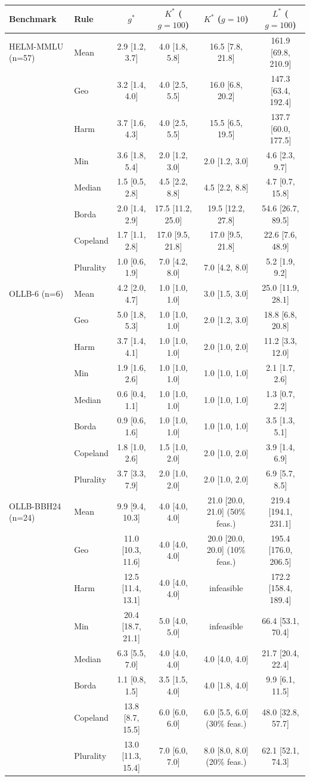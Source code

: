 \begin{tabular}{llcccc}\toprule
Benchmark & Rule & $g^*$ & $K^*$ ($g{=}100$) & $K^*$ ($g{=}10$) & $L^*$ ($g{=}100$)\\\midrule
HELM-MMLU (n=57) & Mean & 2.9 [1.2, 3.7] & 4.0 [1.8, 5.8] & 16.5 [7.8, 21.8] & 161.9 [69.8, 210.9]\\
 & Geo & 3.2 [1.4, 4.0] & 4.0 [2.5, 5.5] & 16.0 [6.8, 20.2] & 147.3 [63.4, 192.4]\\
 & Harm & 3.7 [1.6, 4.3] & 4.0 [2.5, 5.5] & 15.5 [6.5, 19.5] & 137.7 [60.0, 177.5]\\
 & Min & 3.6 [1.8, 5.4] & 2.0 [1.2, 3.0] & 2.0 [1.2, 3.0] & 4.6 [2.3, 9.7]\\
 & Median & 1.5 [0.5, 2.8] & 4.5 [2.2, 8.8] & 4.5 [2.2, 8.8] & 4.7 [0.7, 15.8]\\
 & Borda & 2.0 [1.4, 2.9] & 17.5 [11.2, 25.0] & 19.5 [12.2, 27.8] & 54.6 [26.7, 89.5]\\
 & Copeland & 1.7 [1.1, 2.8] & 17.0 [9.5, 21.8] & 17.0 [9.5, 21.8] & 22.6 [7.6, 48.9]\\
 & Plurality & 1.0 [0.6, 1.9] & 7.0 [4.2, 8.0] & 7.0 [4.2, 8.0] & 5.2 [1.9, 9.2]\\
\midrule
OLLB-6 (n=6) & Mean & 4.2 [2.0, 4.7] & 1.0 [1.0, 1.0] & 3.0 [1.5, 3.0] & 25.0 [11.9, 28.1]\\
 & Geo & 5.0 [1.8, 5.3] & 1.0 [1.0, 1.0] & 2.0 [1.2, 3.0] & 18.8 [6.8, 20.8]\\
 & Harm & 3.7 [1.4, 4.1] & 1.0 [1.0, 1.0] & 2.0 [1.0, 2.0] & 11.2 [3.3, 12.0]\\
 & Min & 1.9 [1.6, 2.6] & 1.0 [1.0, 1.0] & 1.0 [1.0, 1.0] & 2.1 [1.7, 2.6]\\
 & Median & 0.6 [0.4, 1.1] & 1.0 [1.0, 1.0] & 1.0 [1.0, 1.0] & 1.3 [0.7, 2.2]\\
 & Borda & 0.9 [0.6, 1.6] & 1.0 [1.0, 1.0] & 1.0 [1.0, 1.0] & 3.5 [1.3, 5.1]\\
 & Copeland & 1.8 [1.0, 2.6] & 1.5 [1.0, 2.0] & 2.0 [1.0, 2.0] & 3.9 [1.4, 6.9]\\
 & Plurality & 3.7 [3.3, 7.9] & 2.0 [1.0, 2.0] & 2.0 [1.0, 2.0] & 6.9 [5.7, 8.5]\\
\midrule
OLLB-BBH24 (n=24) & Mean & 9.9 [9.4, 10.3] & 4.0 [4.0, 4.0] & 21.0 [20.0, 21.0] (50\% feas.) & 219.4 [194.1, 231.1]\\
 & Geo & 11.0 [10.3, 11.6] & 4.0 [4.0, 4.0] & 20.0 [20.0, 20.0] (10\% feas.) & 195.4 [176.0, 206.5]\\
 & Harm & 12.5 [11.4, 13.1] & 4.0 [4.0, 4.0] & infeasible & 172.2 [158.4, 189.4]\\
 & Min & 20.4 [18.7, 21.1] & 5.0 [4.0, 5.0] & infeasible & 66.4 [53.1, 70.4]\\
 & Median & 6.3 [5.5, 7.0] & 4.0 [4.0, 4.0] & 4.0 [4.0, 4.0] & 21.7 [20.4, 22.4]\\
 & Borda & 1.1 [0.8, 1.5] & 3.5 [1.5, 4.0] & 4.0 [1.8, 4.0] & 9.9 [6.1, 11.5]\\
 & Copeland & 13.8 [8.7, 15.5] & 6.0 [6.0, 6.0] & 6.0 [5.5, 6.0] (30\% feas.) & 48.0 [32.8, 57.7]\\
 & Plurality & 13.0 [11.3, 15.4] & 7.0 [6.0, 7.0] & 8.0 [8.0, 8.0] (20\% feas.) & 62.1 [52.1, 74.3]\\
\bottomrule\end{tabular}
